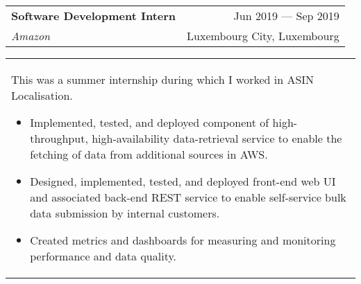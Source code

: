 \documentclass[11pt]{article}
\begin{document}
\begin{tabularx}{\textwidth}{X r}
    \textbf{Software Development Intern}   & \small{Jun 2019 --- Sep 2019} \\
    \emph{Amazon}              & \small{Luxembourg City, Luxembourg} \\
\end{tabularx}
\begin{tabularx}{\textwidth}{X}
    This was a summer internship during which I worked in ASIN Localisation.
    \begin{itemize}
        \item Implemented, tested, and deployed component of high-throughput,
            high-availability data-retrieval service to enable the fetching of data from
            additional sources in AWS.\@
        \item Designed, implemented, tested, and deployed front-end web UI and
            associated back-end REST service to enable self-service bulk data submission
            by internal customers.
        \item Created metrics and dashboards for measuring and monitoring performance
            and data quality.
    \end{itemize}
\end{tabularx}

\midrule
\end{document}
